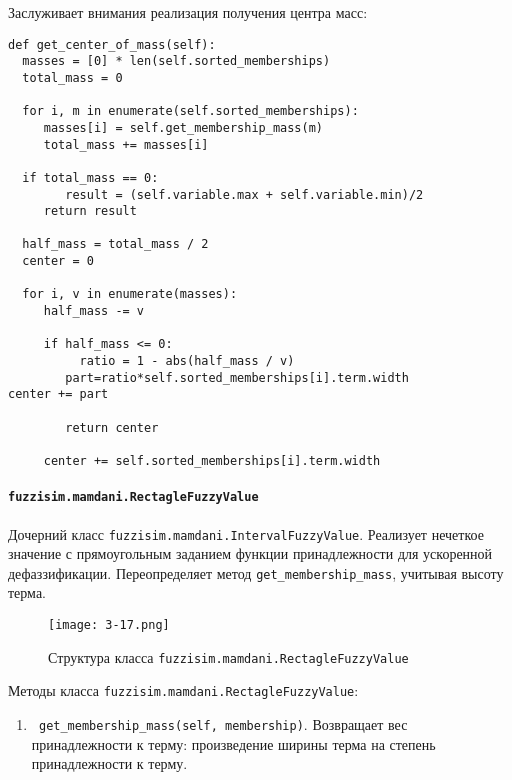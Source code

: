 Заслуживает внимания реализация получения центра масс:
\begin{lstlisting}[style=pythonstyle,caption={  }, label=lst:func:1]
def get_center_of_mass(self):
  masses = [0] * len(self.sorted_memberships)
  total_mass = 0

  for i, m in enumerate(self.sorted_memberships):
     masses[i] = self.get_membership_mass(m)
     total_mass += masses[i]

  if total_mass == 0:
		result = (self.variable.max + self.variable.min)/2
     return result

  half_mass = total_mass / 2
  center = 0

  for i, v in enumerate(masses):
     half_mass -= v

     if half_mass <= 0:
          ratio = 1 - abs(half_mass / v)
  		part=ratio*self.sorted_memberships[i].term.width
center += part

        return center

     center += self.sorted_memberships[i].term.width
\end{lstlisting}








\paragraph{\lstinline!fuzzisim.mamdani.RectagleFuzzyValue!}

Дочерний класс \lstinline!fuzzisim.mamdani.IntervalFuzzyValue!. Реализует нечеткое значение с прямоугольным заданием функции принадлежности для ускоренной дефаззификации. Переопределяет метод \lstinline!get_membership_mass!, учитывая высоту терма.

\begin{figure}[ht]
	\centering
	\texttt{[image: 3-17.png]}
	\caption{ Структура класса \lstinline!fuzzisim.mamdani.RectagleFuzzyValue!}
\end{figure}


Методы класса \lstinline!fuzzisim.mamdani.RectagleFuzzyValue!:
\begin{enumerate}[label=\arabic*)]
	\item \lstinline! get_membership_mass(self, membership)!. Возвращает вес принадлежности к терму: произведение ширины терма на степень принадлежности к терму.
\end{enumerate}






